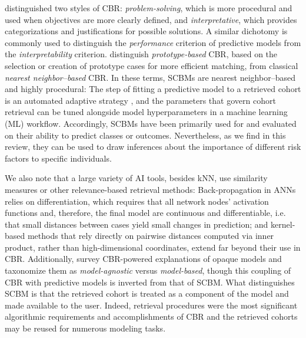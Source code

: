 \documentclass[sn-mathphys,Numbered,pdflatex]{sn-jnl}
\theoremstyle{remark}
\theoremstyle{definition}
\newcommand{\hl}[1]{#1}
\begin{document}
\citet{Kolodner1992} distinguished two styles of CBR:
\emph{problem-solving}, which is more procedural and used when
objectives are more clearly defined, and \emph{interpretative}, which
provides categorizations and justifications for possible solutions. A
similar dichotomy is commonly used to distinguish the \emph{performance}
\hl{criterion }of predictive models from the \emph{interpretability}
criterion\hl{.}
\citet{Rudin2022}\hl{ distinguish \emph{prototype-based} CBR, based on the selection or creation of prototype cases for more efficient matching, from classical \emph{nearest neighbor--based} CBR.}
In these terms, \hl{SCBM}s are \hl{nearest neighbor--based and }highly
procedural: The step of fitting a predictive model to a retrieved cohort
is an automated adaptive strategy \citep{Begum2011}, and the parameters
that govern cohort retrieval can be tuned alongside model
hyperparameters in a machine learning (ML) workflow. Accordingly,
\hl{SCBM}s have been primarily used for and evaluated on their ability
to predict classes or outcomes. Nevertheless, as
\hl{we find in this review}, they can be used to draw inferences about
the importance of different risk factors to specific individuals.

\hl{We also note that a large variety of AI tools, besides kNN, use similarity measures or other relevance-based retrieval methods: Back-propagation in ANNs relies on differentiation, which requires that all network nodes' activation functions and, therefore, the final model are continuous and differentiable, i.e. that small distances between cases yield small changes in prediction; and kernel-based methods that rely directly on pairwise distances computed via inner product, rather than high-dimensional coordinates, extend far beyond their use in CBR.
Additionally, }\citet{Schoenborn2021}\hl{ survey CBR-powered explanations of opaque models and taxonomize them as \emph{model-agnostic} versus \emph{model-based}, though this coupling of CBR with predictive models is inverted from that of SCBM.
What distinguishes SCBM is that the retrieved cohort is treated as a component of the model and made available to the user. Indeed, retrieval procedures were the most significant algorithmic requirements and accomplishments of CBR }\citep{Kolodner1992, Gierl1998}\hl{ and the retrieved cohorts may be reused for numerous modeling tasks.}
\end{document}
